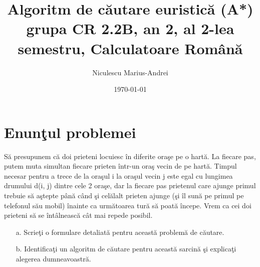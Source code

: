 \documentclass{article}
\title{Algoritm de c\u{a}utare euristic\u{a} (A*)  \\
\large{grupa CR 2.2B, an 2, al 2-lea semestru, Calculatoare Rom\^{a}n\u{a}}}
\author{Niculescu Marius-Andrei }
\date{\today}
\begin{document}
\maketitle


\newpage

\tableofcontents

\newpage

\section{Enun\c{t}ul problemei}

S\u{a} presupunem c\u{a} doi prieteni locuiesc \^{i}n diferite ora\c{s}e pe o hart\u{a}. La fiecare pas, putem muta simultan fiecare prieten \^{i}ntr-un ora\c{s} vecin de pe hart\u{a}. Timpul necesar pentru a trece de la ora\c{s}ul i la ora\c{s}ul vecin j este egal cu lungimea drumului d(i, j) dintre cele 2 ora\c{s}e, dar la fiecare pas prietenul care ajunge primul trebuie s\u{a} a\c{s}tepte p\^{a}n\u{a} c\^{a}nd \c{s}i cel\u{a}lalt prieten ajunge (\c{s}i \^{i}l sun\u{a} pe primul pe telefonul s\u{a}u mobil) \^{i}nainte ca urm\u{a}toarea tur\u{a} s\u{a} poat\u{a} \^{i}ncepe. Vrem ca cei doi prieteni s\u{a} se \^{i}nt\^{a}lneasc\u{a} c\^{a}t mai repede posibil. 

\begin{itemize}
    \item [a.]
    Scrie\c{t}i o formulare detaliat\u{a} pentru aceast\u{a} problem\u{a} de c\u{a}utare.
    \item [b.]
    Identifica\c{t}i un algoritm de c\u{a}utare pentru aceast\u{a} sarcin\u{a} \c{s}i explica\c{t}i alegerea dumneavoastr\u{a}.
\end{itemize}
\end{document}
